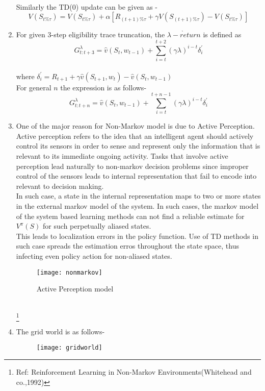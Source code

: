 \documentclass[english]{article}
\begin{document}
\begin{enumerate}
\[\]
\\
Similarly the TD(0) update can be given as -
\[
V(S_{t\%\tau})=V(S_{t\%\tau})+\alpha[R_{(t+1)\%\tau}+\gamma V(S_{(t+1)\%\tau})-V(S_{t\%\tau})]
\]
\item For given 3-step eligibility trace truncation, the $\grave{\lambda-return}$
is defined as
\[
G_{t:t+3}^{\lambda}=\hat{v}(S_{t},w_{t-1})+\sum_{i=t}^{t+2}(\gamma\lambda)^{i-t}\delta_{i}^{'}
\]
\\
where $\delta_{i}^{'}=R_{t+1}+\gamma\hat{v}(S_{t+1},w_{t})-\hat{v}(S_{t},w_{t-1})$\\
For general $n$ the expression is as follows-
\[
G_{t:t+n}^{\lambda}=\hat{v}(S_{t},w_{t-1})+\sum_{i=t}^{t+n-1}(\gamma\lambda)^{i-t}\delta_{i}^{'}
\]
\item One of the major reason for Non-Markov model is due to Active Perception.
Active perception refers to the idea that an intelligent agent should
actively control its sensors in order to sense and represent only
the information that is relevant to its immediate ongoing activity.
Tasks that involve active perception lead naturally to non-markov
decision problems since improper control of the sensors leads to internal
representation that fail to encode into relevant to decision making.\\
In such case, a state in the internal representation maps to two or
more states in the external markov model of the system. In such cases,
the markov model of the system based learning methods can not find
a reliable estimate for $V^{\pi}(S)$ for such perpetually aliased
states.\\
This leads to localization errors in the policy function. Use of TD
methods in such case spreads the estimation erros throughout the state
space, thus infecting even policy action for non-aliased states.
\begin{figure}
\texttt{[image: nonmarkov]}

\caption{Active Perception model}
\end{figure}
\\
\footnote{Ref: Reinforcement Learning in Non-Markov Environments(Whitehead and
co.,1992)}
\item The grid world is as follows-
\begin{figure}
\texttt{[image: gridworld]}


\end{figure}
\end{enumerate}
\end{document}
